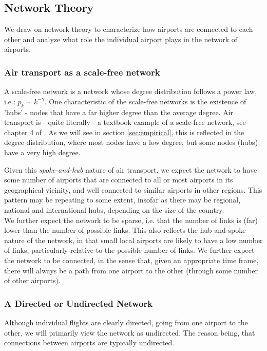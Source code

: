 \subsection{Network Theory}
\label{subsec:Network Theory}
We draw on network theory to characterize how airports are connected to each other and analyze what role the individual airport plays in the network of airports. %

\subsubsection{Air transport as a scale-free network}
A scale-free network is a network whose degree distribution follows a power law, i.e.: $p_k \sim k^{-\gamma}$. One characteristic of the scale-free networks is the existence of 'hubs' - nodes that have a far higher degree than the average degree. Air transport is - quite literally - a textbook example of a scale-free network, see chapter 4 of \citet{barabasi2016networks}. As we will see in section \ref{sec:empirical}, this is reflected in the degree distribution, where most nodes have a low degree, but some nodes (hubs) have a very high degree.

Given this \textit{spoke-and-hub} nature of air transport, we expect the network to have some number of airports that are connected to all or most airports in its geographical vicinity, and well connected to similar airports in other regions. This pattern may be repeating to some extent, insofar as there may be regional, national and international hubs, depending on the size of the country. \\ 
\medskip
We further expect the network to be sparse, i.e. that the number of links is (far) lower than the number of possible links. This also reflects the hub-and-spoke nature of the network, in that small local airports are likely to have a low number of links, particularly relative to the possible number of links. We further expect the network to be connected, in the sense that, given an appropriate time frame, there will always be a path from one airport to the other (through some number of other airports).

\subsubsection{A Directed or Undirected Network}
Although individual flights are clearly directed, going from one airport to the other, we will primarily view the network as undirected. The reason being, that connections between airports are typically undirected.

